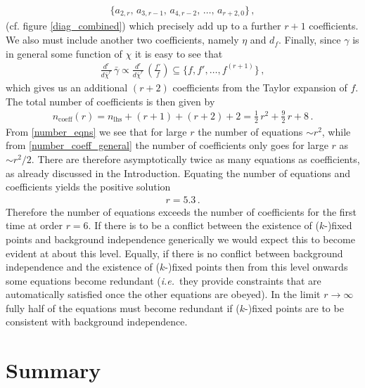 \documentclass[11pt,draft]{book} %
\newcommand\ie{\textit{i.e.}\ }
\begin{document}
\begin{align}
  \bigg\lbrace
  a_{2,r},\, a_{3,r-1},\, a_{4,r-2},\, \dots,\, a_{r+2,0}
  \bigg\rbrace \,,
\end{align}
(cf. figure \ref{diag_combined}) which precisely add up to a further $r+1$ coefficients.
We also must include another two coefficients, namely $\eta$ and $d_f$.
Finally, since $\gamma$ is in general some function of $\chi$ it is easy to see that
\begin{align}
  \frac{d^r}{d \bar\chi^r} \, \bar{\gamma} \propto \frac{d^r}{d \bar\chi^r} \, \left( \frac{f'}{f}\right) \subseteq
  \bigg\lbrace f, f', \dots, f^{(r+1)}   \bigg\rbrace \,,
\end{align}
which gives us an additional $(r+2)$ coefficients from the Taylor expansion of $f$.
The total number of coefficients is then given by
\begin{align}
  \label{number_coeff_general}
  n_{\text{coeff}}(r) = n_{\text{lhs}} + (r+1) + (r+2) + 2  = \frac{1}{2} \, r^2 + \frac{9}{2} \, r + 8 \,.
\end{align}
From \eqref{number_eqns} we see that for large $r$ the number of equations $\sim r^2$,
while from \eqref{number_coeff_general} the number of coefficients only goes for large $r$ as $\sim r^2/2$.
There are therefore asymptotically twice as many equations as coefficients,
as already discussed in the Introduction.
Equating the number of equations and coefficients yields the positive solution
\begin{align}
  r = 5.3 \,.
\end{align}
Therefore the number of equations exceeds the number of coefficients for the first time at order $r=6$.
If there is to be a conflict between the existence of ($k$-)fixed points and background independence
generically we would expect this to become evident at about this level.
Equally, if there is no conflict between background independence and the existence of ($k$-)fixed points
then from this level onwards some equations become redundant
(\ie they provide constraints that are automatically satisfied once the other equations are obeyed).
In the limit $r\to\infty$ fully half of the equations must become redundant if ($k$-)fixed points are
to be consistent with background independence.


\section{Summary}
\label{sec:conclusions}
\end{document}
